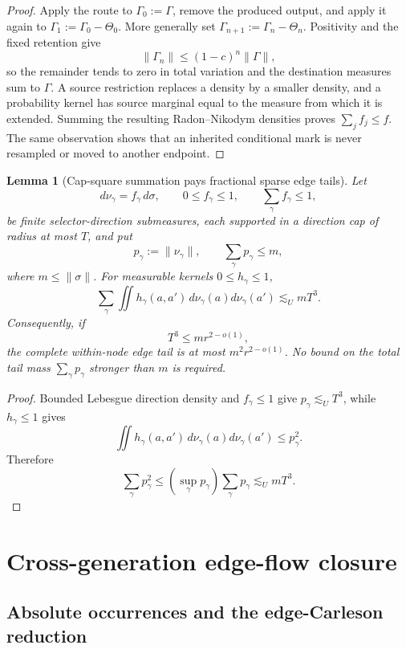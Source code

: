 \documentclass[10pt]{article}
\newtheorem{lemma}[theorem]{Lemma}
\begin{document}
\begin{proof}
Apply the route to \(\Gamma_0:=\Gamma\), remove the produced output, and apply it again to
\(\Gamma_1:=\Gamma_0-\Theta_0\).  More generally set
\(\Gamma_{n+1}:=\Gamma_n-\Theta_n\).  Positivity and the fixed retention give
\[
 \|\Gamma_n\|\le(1-c)^n\|\Gamma\|,
\]
so the remainder tends to zero in total variation and the destination measures sum to
\(\Gamma\).  A source restriction replaces a density by a smaller density, and a probability
kernel has source marginal equal to the measure from which it is extended.  Summing the resulting
Radon--Nikodym densities proves \(\sum_jf_j\le f\).  The same observation shows that an inherited
conditional mark is never resampled or moved to another endpoint.
\end{proof}

\begin{lemma}[Cap-square summation pays fractional sparse edge tails]
\label{lem:v081-cap-square-edge-tail}
Let
\[
d\nu_\gamma=f_\gamma\,d\sigma,
\qquad
0\le f_\gamma\le1,
\qquad
\sum_\gamma f_\gamma\le1,
\]
be finite selector-direction submeasures, each supported in a direction cap of radius at most
\(T\), and put
\[
p_\gamma:=\|\nu_\gamma\|,
\qquad
\sum_\gamma p_\gamma\le m,
\]
where \(m\le\|\sigma\|\).  For measurable kernels \(0\le h_\gamma\le1\),
\begin{equation}
\label{eq:v081-cap-square-edge-tail}
\boxed{
\sum_\gamma
\iint
h_\gamma(a,a')\,d\nu_\gamma(a)d\nu_\gamma(a')
\lesssim_U
mT^3.
}
\end{equation}
Consequently, if
\[
T^3\le mr^{2-o(1)},
\]
the complete within-node edge tail is at most \(m^2r^{2-o(1)}\).  No bound on the total tail mass
\(\sum_\gamma p_\gamma\) stronger than \(m\) is required.
\end{lemma}

\begin{proof}
Bounded Lebesgue direction density and \(f_\gamma\le1\) give
\(p_\gamma\lesssim_UT^3\), while \(h_\gamma\le1\) gives
\[
\iint h_\gamma(a,a')\,d\nu_\gamma(a)d\nu_\gamma(a')
\le p_\gamma^2.
\]
Therefore
\[
\sum_\gamma p_\gamma^2
\le
\left(\sup_\gamma p_\gamma\right)\sum_\gamma p_\gamma
\lesssim_U
mT^3.
\]
\end{proof}

\clearpage
\section{Cross-generation edge-flow closure}

\subsection{Absolute occurrences and the edge-Carleson reduction}
\end{document}
